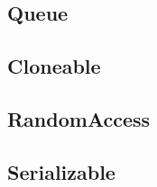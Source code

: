 \subsection{Queue}

\subsection{Cloneable}

\subsection{RandomAccess}

\subsection{Serializable}





